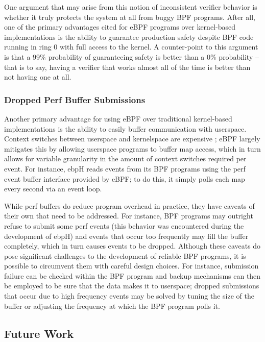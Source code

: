 \documentclass[
  12pt]{findlay}
\begin{document}
One argument that may arise from this notion of inconsistent verifier
behavior is whether it truly protects the system at all from buggy BPF
programs. After all, one of the primary advantages cited for eBPF
programs over kernel-based implementations is the ability to guarantee
production safety despite BPF code running in ring 0 with full access to
the kernel. A counter-point to this argument is that a 99\% probability
of guaranteeing safety is better than a 0\% probability -- that is to
say, having a verifier that works almost all of the time is better than
not having one at all.

\hypertarget{dropped-perf-buffer-submissions}{%
\subsubsection{Dropped Perf Buffer
Submissions}\label{dropped-perf-buffer-submissions}}

Another primary advantage for using eBPF over traditional kernel-based
implementations is the ability to easily buffer communication with
userspace. Context switches between userspace and kernelspace are
expensive \autocite{gebai18}; eBPF largely mitigates this by allowing
userspace programs to buffer map access, which in turn allows for
variable granularity in the amount of context switches required per
event. For instance, ebpH reads events from its BPF programs using the
perf event buffer interface provided by eBPF; to do this, it simply
polls each map every second via an event loop.

While perf buffers do reduce program overhead in practice, they have
caveats of their own that need to be addressed. For instance, BPF
programs may outright refuse to submit some perf events (this behavior
was encountered during the development of ebpH) and events that occur
too frequently may fill the buffer completely, which in turn causes
events to be dropped. Although these caveats do pose significant
challenges to the development of reliable BPF programs, it is possible
to circumvent them with careful design choices. For instance, submission
failure can be checked within the BPF program and backup mechanisms can
then be employed to be sure that the data makes it to userspace; dropped
submissions that occur due to high frequency events may be solved by
tuning the size of the buffer or adjusting the frequency at which the
BPF program polls it.

\hypertarget{future-work}{%
\subsection{Future Work}\label{future-work}}
\end{document}
